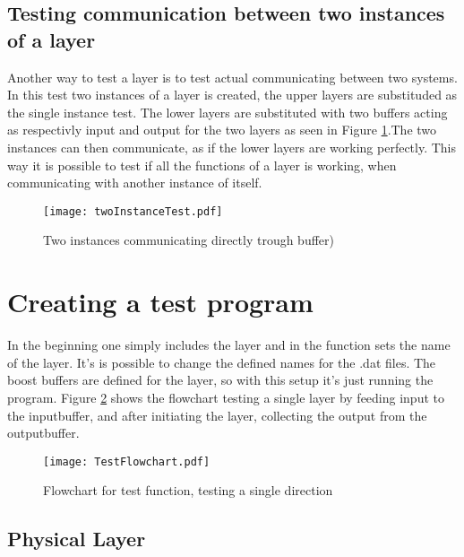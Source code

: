 \subsection{Testing communication between two instances of a layer}

Another way to test a layer is to test actual communicating between two systems. In this test two instances of a layer is created, the upper layers are substituded as the single instance test. The lower layers are substituted with two buffers acting as respectivly  input and output for the two layers as seen in Figure \ref{fig:twoInstanceTest}.The two instances can then communicate, as if the lower layers are working perfectly. This way it is possible to test if all the functions of a layer is working, when communicating with another instance of itself.




\begin{figure}[htb]
	\begin{center}
	\texttt{[image: twoInstanceTest.pdf]}%
	\caption{Two instances communicating directly trough buffer)}
	\label{fig:twoInstanceTest}	
	\end{center}
\end{figure}



\section{Creating a test program}
In the beginning one simply includes the layer and in the function sets the name of the layer. It's is possible to change the defined names for the .dat files. The boost buffers are defined for the layer, so with this setup it's just running the program.
Figure \ref{fig:TestFlowchart} shows the flowchart testing a single layer by feeding input to the inputbuffer, and after initiating the layer, collecting the output from the outputbuffer. 


\begin{figure}[htb]
	\begin{center}
	\texttt{[image: TestFlowchart.pdf]}
	\caption{Flowchart for test function, testing a single direction}
	\label{fig:TestFlowchart}	
	\end{center}
\end{figure}

\subsection{Physical Layer}


